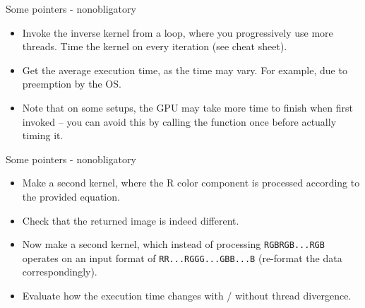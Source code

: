 \documentclass[11pt,t]{beamer}
\newcommand{\inline}[1]{ \colorbox{mygray}{\lstinline{#1}}}
\begin{document}
\begin{frame}{Some pointers - nonobligatory}

\begin{itemize}\setlength\itemsep{1em}
    \item Invoke the inverse kernel from a loop, where you progressively use more threads. Time the kernel on every iteration (see cheat sheet).
    \item Get the average execution time, as the time may vary. For example, due to preemption by the OS. 
    \item Note that on some setups, the GPU may take more time to finish when first invoked -- you can avoid this by calling the function once before actually timing it.
\end{itemize}
    
\end{frame}


\begin{frame}{Some pointers - nonobligatory}

\begin{itemize}\setlength\itemsep{1em}
    \item Make a second kernel, where the R color component is processed according to the provided equation. 
    \item Check that the returned image is indeed different.
    \item Now make a second kernel, which instead of processing \inline{RGBRGB...RGB} operates on an input format of \inline{RR...RGGG...GBB...B} (re-format the data correspondingly).
    \item Evaluate how the execution time changes with / without thread divergence.
\end{itemize}
    
\end{frame}
\end{document}
